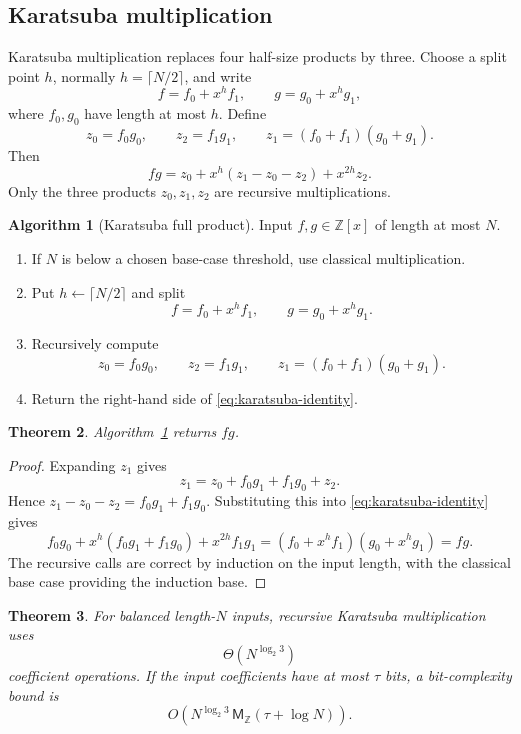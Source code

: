 \documentclass[11pt]{book}
\newtheorem{theorem}{Theorem}[section]
\theoremstyle{definition}
\newtheorem{algorithm}[theorem]{Algorithm}
\newcommand{\ZZ}{\mathbb Z}
\newcommand{\MZ}{\mathsf M_{\ZZ}}
\begin{document}
\subsection{Karatsuba multiplication}

Karatsuba multiplication replaces four half-size products by three.  Choose a
split point $h$, normally $h=\lceil N/2\rceil$, and write
\[
 f=f_0+x^h f_1,
 \qquad
 g=g_0+x^h g_1,
\]
where $f_0,g_0$ have length at most $h$.  Define
\[
 z_0=f_0g_0,
 \qquad
 z_2=f_1g_1,
 \qquad
 z_1=(f_0+f_1)(g_0+g_1).
\]
Then
\begin{equation}\label{eq:karatsuba-identity}
 fg=z_0+x^h(z_1-z_0-z_2)+x^{2h}z_2.
\end{equation}
Only the three products $z_0,z_1,z_2$ are recursive multiplications.

\begin{algorithm}[Karatsuba full product]\label{alg:karatsuba-product}
Input $f,g\in\ZZ[x]$ of length at most $N$.
\begin{enumerate}
 \item If $N$ is below a chosen base-case threshold, use classical
 multiplication.
 \item Put $h\leftarrow\lceil N/2\rceil$ and split
 \[
   f=f_0+x^hf_1,\qquad g=g_0+x^hg_1.
 \]
 \item Recursively compute
 \[
   z_0=f_0g_0,\qquad z_2=f_1g_1,
   \qquad z_1=(f_0+f_1)(g_0+g_1).
 \]
 \item Return the right-hand side of \eqref{eq:karatsuba-identity}.
\end{enumerate}
\end{algorithm}

\begin{theorem}\label{thm:karatsuba-correctness}
Algorithm~\ref{alg:karatsuba-product} returns $fg$.
\end{theorem}

\begin{proof}
Expanding $z_1$ gives
\[
 z_1=z_0+f_0g_1+f_1g_0+z_2.
\]
Hence $z_1-z_0-z_2=f_0g_1+f_1g_0$.  Substituting this into
\eqref{eq:karatsuba-identity} gives
\[
 f_0g_0+x^h(f_0g_1+f_1g_0)+x^{2h}f_1g_1
 =(f_0+x^hf_1)(g_0+x^hg_1)=fg.
\]
The recursive calls are correct by induction on the input length, with the
classical base case providing the induction base.
\end{proof}

\begin{theorem}\label{thm:karatsuba-complexity}
For balanced length-$N$ inputs, recursive Karatsuba multiplication uses
\[
 \Theta\!\left(N^{\log_2 3}\right)
\]
coefficient operations.  If the input coefficients have at most $\tau$ bits,
a bit-complexity bound is
\[
 O\!\left(
 N^{\log_2 3}\,\MZ(\tau+\log N)
 \right).
\]
\end{theorem}
\end{document}
